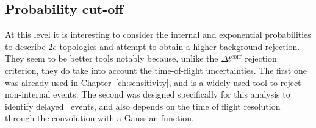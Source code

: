 \subsection{Probability cut-off}

At this level it is interesting to consider the internal and exponential probabilities to describe $2e$ topologies and attempt to obtain a higher background rejection.
They seem to be better tools notably because, unlike the $\Delta t^{\text{corr}}$ rejection criterion, they do take into account the time-of-flight uncertainties.
The first one was already used in Chapter~\ref{ch:sensitivity}, and is a widely-used tool to reject non-internal events.
The second was designed specifically for this analysis to identify delayed \Tl\ events, and also depends on the time of flight resolution through the convolution with a Gaussian function.

